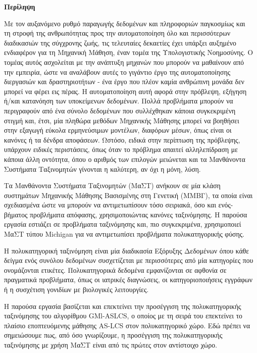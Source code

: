 \begin{center}
\centering

\vspace{0.5cm}
\centering
\textbf{\Large{Περίληψη}}

\vspace{1cm}

\end{center}
Με τον αυξανόμενο ρυθμό παραγωγής δεδομένων και πληροφοριών παγκοσμίως και τη στροφή της ανθρωπότητας προς την αυτοματοποίηση όλο και περισσότερων διαδικασιών της σύγχρονης ζωής, τις τελευταίες δεκαετίες έχει υπάρξει αυξημένο ενδιαφέρον για τη Μηχανική Μάθηση, έναν τομέα της Υπολογιστικής Νοημοσύνης. Ο τομέας αυτός ασχολείται με την ανάπτυξη μηχανών που μπορούν να μαθαίνουν από την εμπειρία, ώστε να αναλάβουν αυτές το γιγάντιο έργο της αυτοματοποίησης διεργασιών και δραστηριοτήτων - ένα έργο που πλέον καμία ανθρώπινη μονάδα δεν μπορεί να φέρει εις πέρας. Η αυτοματοποίηση αυτή αφορά στην πρόβλεψη, εξήγηση ή/και κατανόηση των υποκείμενων δεδομένων. Πολλά προβλήματα μπορούν να περιγραφούν από ένα σύνολο δεδομένων που συλλέχθηκαν κάποια συγκεκριμένη στιγμή και, έτσι, μία πληθώρα μεθόδων Μηχανικής Μάθησης μπορεί να βοηθήσει στην εξαγωγή εύκολα ερμηνεύσιμων μοντέλων, διαφόρων μέσων, όπως είναι οι κανόνες ή τα δένδρα αποφάσεων. Ωστόσο, ειδικά στην περίπτωση της πρόβλεψης, υπάρχουν ειδικές περιστάσεις, όπως όταν το πρόβλημα απαιτεί αλληλεπίδραση με κάποια άλλη οντότητα, όπου ο αριθμός των επιλογών μειώνεται και τα Μανθάνοντα Συστήματα Ταξινομητών γίνονται η καλύτερη, αν όχι η μόνη, λύση.

Τα Μανθάνοντα Συστήματα Ταξινομητών (ΜαΣΤ) ανήκουν σε μία κλάση συστημάτων Μηχανικής Μάθησης Βασισμένης στη Γενετική (ΜΜΒΓ), τα οποία είναι σχεδιασμένα ώστε να μπορούν να αντιμετωπίσουν τόσο σειριακά, όσο και ενός-βήματος προβλήματα απόφασης, χρησιμοποιώντας κανόνες ταξινόμησης. Η παρούσα εργασία εστιάζει σε προβλήματα ταξινόμησης και, πιο συγκεκριμένα, χρησιμοποιεί ΜαΣΤ τύπου Michigan για να αντιμετωπίσει προβλήματα πολυκατηγορικής φύσης.

Η πολυκατηγορική ταξινόμηση είναι μία διαδικασία Εξόρυξης Δεδομένων όπου κάθε δείγμα ενός συνόλου δεδομένων συσχετίζεται με περισσότερες από μία κατηγορίες που ονομάζονται ετικέτες. Πολυκατηγορικά δεδομένα εμφανίζονται σε αφθονία σε πραγματικά προβλήματα, όπως οι ιατρικές διαγνώσεις, οι κατηγοριοποιήσεις εγγράφων ή η συσχέτιση γονιδίων με βιολογικές λειτουργίες.

Η παρούσα εργασία βασίζεται και επεκτείνει την προσέγγιση της πολυκατηγορικής ταξινόμησης του αλγορίθμου GMl-ASLCS, ο οποίος με τη σειρά του επεκτείνει το πλαίσιο εποπτευόμενης μάθησης AS-LCS στον πολυκατηγορικό χώρο. Εδώ πρέπει να σημειώσουμε πως, από όσο γνωρίζουμε, η προσέγγιση της πολυκατηγορικής ταξινόμησης με χρήση ΜαΣΤ είναι από τις πρώτες στον αντίστοιχο χώρο. 


